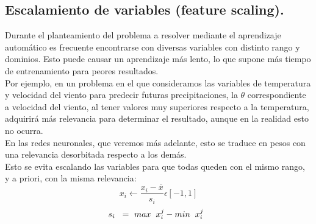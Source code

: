 \documentclass[a4paper,10pt]{article}
\begin{document}
\subsection{Escalamiento de variables (feature scaling).}

Durante el planteamiento del problema a resolver mediante el aprendizaje automático es frecuente encontrarse con diversas variables con distinto rango y dominios. Esto puede causar un aprendizaje más lento, lo que supone más tiempo de entrenamiento para peores resultados. \\
Por ejemplo, en un problema en el que consideramos las variables de temperatura y velocidad del viento para predecir futuras precipitaciones, la $\theta$ correspondiente a  velocidad del viento, al tener valores muy superiores respecto a la temperatura, adquirirá más relevancia para determinar el resultado, aunque en la realidad esto no ocurra.\\ En las redes neuronales, que veremos más adelante, esto se traduce en pesos con una relevancia desorbitada respecto a los demás.\\
Esto se evita escalando las variables para que todas queden con el mismo rango, y a priori, con la misma relevancia:
\[
x_i \longleftarrow \frac{x_i - \overline{x}}{s_i} \epsilon [-1,1]
\]
\hspace{0.20cm}
\[
s_i \hspace{0.20cm} = \  max\hspace{0.20cm}x_{i}^j -min\hspace{0.20cm}x_{i}^j \hspace{0.20cm}
\]
\newpage
\end{document}

